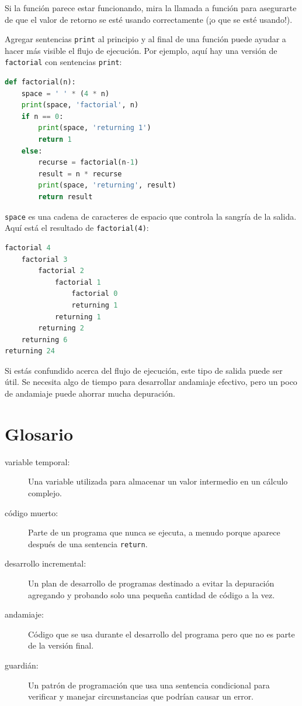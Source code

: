 Si la función parece estar funcionando, mira la llamada a función para asegurarte de que el valor de retorno se esté usando correctamente (¡o que se esté usando!).

Agregar sentencias \texttt{print} al principio y al final de una función puede ayudar a hacer más visible el flujo de ejecución. Por ejemplo, aquí hay una versión de \texttt{factorial} con sentencias \texttt{print}:

\begin{lstlisting}[language=Python]
def factorial(n):
    space = ' ' * (4 * n)
    print(space, 'factorial', n)
    if n == 0:
        print(space, 'returning 1')
        return 1
    else:
        recurse = factorial(n-1)
        result = n * recurse
        print(space, 'returning', result)
        return result
\end{lstlisting}

\texttt{space} es una cadena de caracteres de espacio que controla la sangría de la salida. Aquí está el resultado de \texttt{factorial(4)}:

\begin{lstlisting}[language=Python]
factorial 4
    factorial 3
        factorial 2
            factorial 1
                factorial 0
                returning 1
            returning 1
        returning 2
    returning 6
returning 24
\end{lstlisting}

Si estás confundido acerca del flujo de ejecución, este tipo de salida puede ser útil. Se necesita algo de tiempo para desarrollar andamiaje efectivo, pero un poco de andamiaje puede ahorrar mucha depuración.

\section{Glosario}

\begin{description}
    \item[variable temporal:] Una variable utilizada para almacenar un valor intermedio en un cálculo complejo.
    \item[código muerto:] Parte de un programa que nunca se ejecuta, a menudo porque aparece después de una sentencia \texttt{return}.
    \item[desarrollo incremental:] Un plan de desarrollo de programas destinado a evitar la depuración agregando y probando solo una pequeña cantidad de código a la vez.
    \item[andamiaje:] Código que se usa durante el desarrollo del programa pero que no es parte de la versión final.
    \item[guardián:] Un patrón de programación que usa una sentencia condicional para verificar y manejar circunstancias que podrían causar un error.
\end{description}

